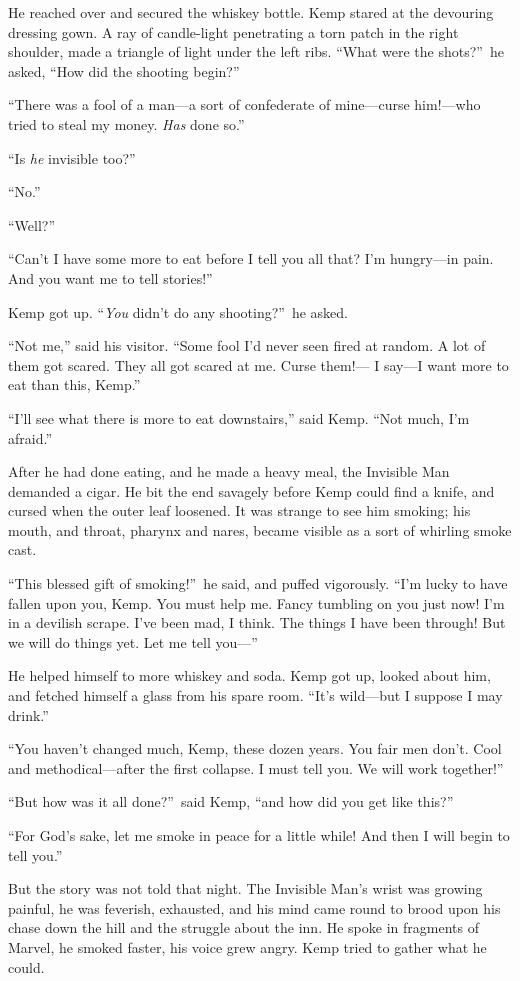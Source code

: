 He reached over and secured the whiskey bottle. Kemp stared at the devouring dressing gown. A ray of candle-light penetrating a torn patch in the right shoulder, made a triangle of light under the left ribs. “What were the shots?”\ he asked, “How did the shooting begin?”

“There was a fool of a man—a sort of confederate of mine—curse him!—who tried to steal my money. \emph{Has} done so.”

“Is \emph{he} invisible too?”

“No.”

“Well?”

“Can’t I have some more to eat before I tell you all that? I’m hungry—in pain. And you want me to tell stories!”

Kemp got up. “\emph{You} didn’t do any shooting?”\ he asked.

“Not me,” said his visitor. “Some fool I’d never seen fired at random. A lot of them got scared. They all got scared at me. Curse them!— I say—I want more to eat than this, Kemp.”

“I’ll see what there is more to eat downstairs,” said Kemp. “Not much, I’m afraid.”

After he had done eating, and he made a heavy meal, the Invisible Man demanded a cigar. He bit the end savagely before Kemp could find a knife, and cursed when the outer leaf loosened. It was strange to see him smoking; his mouth, and throat, pharynx and nares, became visible as a sort of whirling smoke cast.

“This blessed gift of smoking!”\ he said, and puffed vigorously. “I’m lucky to have fallen upon you, Kemp. You must help me. Fancy tumbling on you just now! I’m in a devilish scrape.  I’ve been mad, I think. The things I have been through! But we will do things yet. Let me tell you—”

He helped himself to more whiskey and soda. Kemp got up, looked about him, and fetched himself a glass from his spare room. “It’s wild—but I suppose I may drink.”

“You haven’t changed much, Kemp, these dozen years. You fair men don’t. Cool and methodical—after the first collapse. I must tell you. We will work together!”

“But how was it all done?”\ said Kemp, “and how did you get like this?”

“For God’s sake, let me smoke in peace for a little while! And then I will begin to tell you.”

But the story was not told that night. The Invisible Man’s wrist was growing painful, he was feverish, exhausted, and his mind came round to brood upon his chase down the hill and the struggle about the inn. He spoke in fragments of Marvel, he smoked faster, his voice grew angry. Kemp tried to gather what he could.

